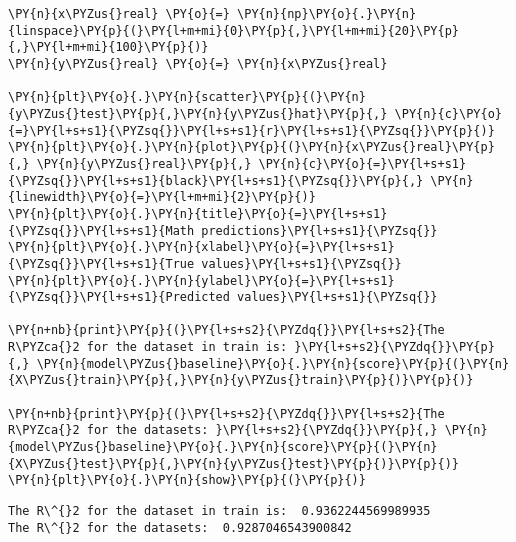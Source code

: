     \begin{tcolorbox}[breakable, size=fbox, boxrule=1pt, pad at break*=1mm,colback=cellbackground, colframe=cellborder]
\begin{Verbatim}[commandchars=\\\{\}]
\PY{n}{x\PYZus{}real} \PY{o}{=} \PY{n}{np}\PY{o}{.}\PY{n}{linspace}\PY{p}{(}\PY{l+m+mi}{0}\PY{p}{,}\PY{l+m+mi}{20}\PY{p}{,}\PY{l+m+mi}{100}\PY{p}{)}
\PY{n}{y\PYZus{}real} \PY{o}{=} \PY{n}{x\PYZus{}real}

\PY{n}{plt}\PY{o}{.}\PY{n}{scatter}\PY{p}{(}\PY{n}{y\PYZus{}test}\PY{p}{,}\PY{n}{y\PYZus{}hat}\PY{p}{,} \PY{n}{c}\PY{o}{=}\PY{l+s+s1}{\PYZsq{}}\PY{l+s+s1}{r}\PY{l+s+s1}{\PYZsq{}}\PY{p}{)}
\PY{n}{plt}\PY{o}{.}\PY{n}{plot}\PY{p}{(}\PY{n}{x\PYZus{}real}\PY{p}{,} \PY{n}{y\PYZus{}real}\PY{p}{,} \PY{n}{c}\PY{o}{=}\PY{l+s+s1}{\PYZsq{}}\PY{l+s+s1}{black}\PY{l+s+s1}{\PYZsq{}}\PY{p}{,} \PY{n}{linewidth}\PY{o}{=}\PY{l+m+mi}{2}\PY{p}{)}
\PY{n}{plt}\PY{o}{.}\PY{n}{title}\PY{o}{=}\PY{l+s+s1}{\PYZsq{}}\PY{l+s+s1}{Math predictions}\PY{l+s+s1}{\PYZsq{}}
\PY{n}{plt}\PY{o}{.}\PY{n}{xlabel}\PY{o}{=}\PY{l+s+s1}{\PYZsq{}}\PY{l+s+s1}{True values}\PY{l+s+s1}{\PYZsq{}}
\PY{n}{plt}\PY{o}{.}\PY{n}{ylabel}\PY{o}{=}\PY{l+s+s1}{\PYZsq{}}\PY{l+s+s1}{Predicted values}\PY{l+s+s1}{\PYZsq{}}

\PY{n+nb}{print}\PY{p}{(}\PY{l+s+s2}{\PYZdq{}}\PY{l+s+s2}{The R\PYZca{}2 for the dataset in train is: }\PY{l+s+s2}{\PYZdq{}}\PY{p}{,} \PY{n}{model\PYZus{}baseline}\PY{o}{.}\PY{n}{score}\PY{p}{(}\PY{n}{X\PYZus{}train}\PY{p}{,}\PY{n}{y\PYZus{}train}\PY{p}{)}\PY{p}{)}

\PY{n+nb}{print}\PY{p}{(}\PY{l+s+s2}{\PYZdq{}}\PY{l+s+s2}{The R\PYZca{}2 for the datasets: }\PY{l+s+s2}{\PYZdq{}}\PY{p}{,} \PY{n}{model\PYZus{}baseline}\PY{o}{.}\PY{n}{score}\PY{p}{(}\PY{n}{X\PYZus{}test}\PY{p}{,}\PY{n}{y\PYZus{}test}\PY{p}{)}\PY{p}{)}
\PY{n}{plt}\PY{o}{.}\PY{n}{show}\PY{p}{(}\PY{p}{)}
\end{Verbatim}
\end{tcolorbox}

    \begin{Verbatim}[commandchars=\\\{\}]
The R\^{}2 for the dataset in train is:  0.9362244569989935
The R\^{}2 for the datasets:  0.9287046543900842
    \end{Verbatim}

    \begin{center}
    \end{center}
    { \hspace*{\fill} \\}
    

